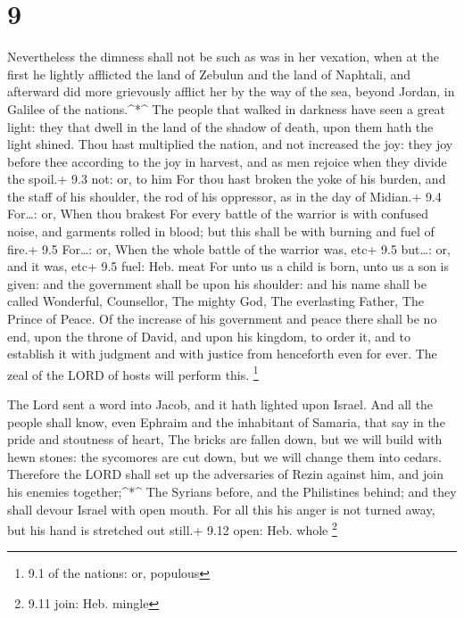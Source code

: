 \hypertarget{section-8}{%
\section{9}\label{section-8}}

 Nevertheless the dimness shall not be such as was in her
vexation, when at the first he lightly afflicted the land of Zebulun and
the land of Naphtali, and afterward did more grievously afflict her by
the way of the sea, beyond Jordan, in Galilee of the nations.\^{}*\^{}
 The people that walked in darkness have seen a great light:
they that dwell in the land of the shadow of death, upon them hath the
light shined.  Thou hast multiplied the nation, and not
increased the joy: they joy before thee according to the joy in harvest,
and as men rejoice when they divide the spoil.+ 9.3 not: or, to him
 For thou hast broken the yoke of his burden, and the staff
of his shoulder, the rod of his oppressor, as in the day of Midian.+ 9.4
For\ldots: or, When thou brakest  For every battle of the
warrior is with confused noise, and garments rolled in blood; but this
shall be with burning and fuel of fire.+ 9.5 For\ldots: or, When the
whole battle of the warrior was, etc+ 9.5 but\ldots: or, and it was,
etc+ 9.5 fuel: Heb. meat  For unto us a child is born, unto
us a son is given: and the government shall be upon his shoulder: and
his name shall be called Wonderful, Counsellor, The mighty God, The
everlasting Father, The Prince of Peace.  Of the increase of
his government and peace there shall be no end, upon the throne of
David, and upon his kingdom, to order it, and to establish it with
judgment and with justice from henceforth even for ever. The zeal of the
LORD of hosts will perform this. \footnote{9.1 of the nations: or,
  populous}

 The Lord sent a word into Jacob, and it hath lighted upon
Israel.  And all the people shall know, even Ephraim and the
inhabitant of Samaria, that say in the pride and stoutness of heart,
 The bricks are fallen down, but we will build with hewn
stones: the sycomores are cut down, but we will change them into cedars.
 Therefore the LORD shall set up the adversaries of Rezin
against him, and join his enemies together;\^{}*\^{}  The
Syrians before, and the Philistines behind; and they shall devour Israel
with open mouth. For all this his anger is not turned away, but his hand
is stretched out still.+ 9.12 open: Heb. whole \footnote{9.11 join: Heb.
  mingle}

